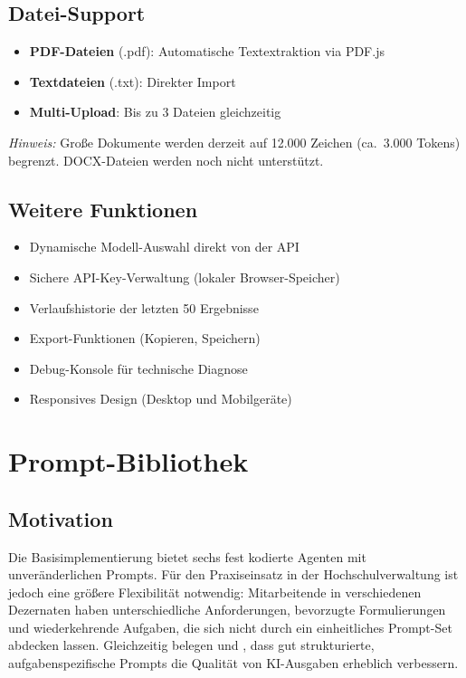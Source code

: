 \documentclass[12pt, a4paper]{article}
\begin{document}
\subsection{Datei-Support}

\begin{itemize}[leftmargin=1.5cm]
  \item \textbf{PDF-Dateien} (.pdf): Automatische Textextraktion via PDF.js
  \item \textbf{Textdateien} (.txt): Direkter Import
  \item \textbf{Multi-Upload}: Bis zu 3 Dateien gleichzeitig
\end{itemize}

\noindent\textit{Hinweis:} Große Dokumente werden derzeit auf 12.000 Zeichen (ca.\ 3.000 Tokens) begrenzt. DOCX-Dateien werden noch nicht unterstützt.

\subsection{Weitere Funktionen}

\begin{itemize}[leftmargin=1.5cm]
  \item Dynamische Modell-Auswahl direkt von der API
  \item Sichere API-Key-Verwaltung (lokaler Browser-Speicher)
  \item Verlaufshistorie der letzten 50 Ergebnisse
  \item Export-Funktionen (Kopieren, Speichern)
  \item Debug-Konsole für technische Diagnose
  \item Responsives Design (Desktop und Mobilgeräte)
\end{itemize}

\section{Prompt-Bibliothek}

\subsection{Motivation}

Die Basisimplementierung bietet sechs fest kodierte Agenten mit unveränderlichen Prompts. Für den Praxiseinsatz in der Hochschulverwaltung ist jedoch eine größere Flexibilität notwendig: Mitarbeitende in verschiedenen Dezernaten haben unterschiedliche Anforderungen, bevorzugte Formulierungen und wiederkehrende Aufgaben, die sich nicht durch ein einheitliches Prompt-Set abdecken lassen. Gleichzeitig belegen \textcite{sahoo2024survey} und \textcite{schulhoff2025promptreport}, dass gut strukturierte, aufgabenspezifische Prompts die Qualität von KI-Ausgaben erheblich verbessern.
\end{document}
